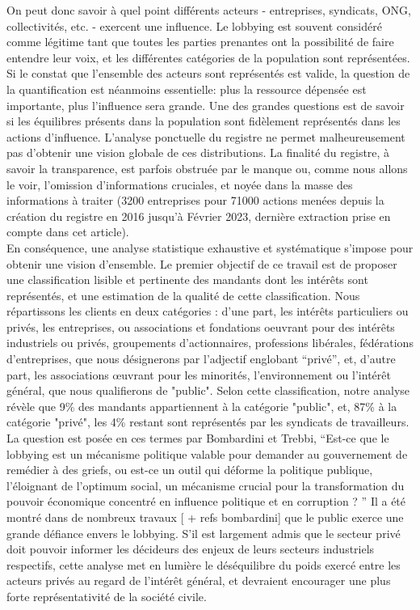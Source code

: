 \documentclass[a4paper,12pt]{article}
\begin{document}
On peut donc savoir à quel point différents acteurs - entreprises, syndicats, ONG, collectivités, etc. - exercent une influence. Le lobbying est souvent considéré comme légitime tant que toutes les parties prenantes ont la possibilité de faire entendre leur voix, et les différentes catégories de la population sont représentées. Si le constat que l'ensemble des acteurs sont représentés est valide, la question de la quantification est néanmoins essentielle: plus la ressource dépensée est importante, plus l’influence sera grande. Une des grandes questions est de savoir si les équilibres présents dans la population sont fidèlement représentés dans les actions d’influence. L'analyse ponctuelle du registre ne permet malheureusement pas d'obtenir une vision globale de ces distributions. La finalité du registre, à savoir la transparence, est parfois obstruée par le manque ou, comme nous allons le voir, l'omission d'informations cruciales, et noyée dans la masse des informations à traiter (3200 entreprises pour 71000 actions menées depuis la création du registre en 2016 jusqu'à Février 2023, dernière extraction prise en compte dans cet article).\\

En conséquence, une analyse statistique exhaustive et systématique s'impose pour obtenir une vision d'ensemble.
Le premier objectif de ce travail est de proposer une classification lisible et pertinente des mandants dont les intérêts sont représentés, et une estimation de la qualité de cette classification.   Nous répartissons les clients en deux catégories : d'une part, les intérêts particuliers ou privés, les entreprises, ou associations et fondations oeuvrant pour des intérêts industriels ou privés, groupements d’actionnaires, professions libérales, fédérations d'entreprises, que nous désignerons par l’adjectif englobant “privé”, et, d'autre part, les associations œuvrant pour les minorités, l'environnement ou l'intérêt général, que nous qualifierons de "public". Selon cette classification, notre analyse révèle que 9\% des mandants appartiennent à la catégorie "public", et, 87\% à la catégorie "privé", les 4\% restant sont représentés par les syndicats de travailleurs.
La question est posée en ces termes par Bombardini et Trebbi, ``Est-ce que le lobbying est un mécanisme politique valable pour demander au gouvernement de remédier à des griefs, ou est-ce un outil qui déforme la politique publique, l'éloignant de l'optimum social, un mécanisme crucial pour la transformation du pouvoir économique concentré en influence politique et en corruption ?
'' 
Il a été montré dans de nombreux travaux [  \cite{KerMon} + refs bombardini] que le public exerce une grande défiance envers le lobbying. S'il est largement admis que le secteur privé doit pouvoir informer les décideurs des enjeux de leurs secteurs industriels respectifs, cette analyse met en lumière le déséquilibre du poids exercé entre les acteurs privés au regard de l'intérêt général, et devraient encourager une plus forte représentativité de la société civile. 
\end{document}
